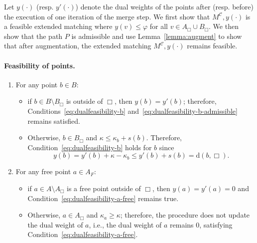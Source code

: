 \documentclass[11pt,onecolumn]{article}
\def\mcC{{\mathcal{C}}}
\newcommand{\cell}{\Box}
\newcommand{\distancetocell}[2]{\mathrm{d}(#1, #2)}
\newcommand{\ymax}{\varphi}
\newcommand\myparagraph[1]{\paragraph{#1}}
\begin{document}
Let $y(\cdot)$ (resp. $y'(\cdot)$) denote the dual weights of the points after (resp. before) the execution of one iteration of the merge step. We first show that $M^\mcC, y(\cdot)$ is a feasible extended matching where $y(v)\le \ymax$ for all $v\in A_\cell\cup B_\cell$. We then show that the path $P$ is admissible and use Lemma~\ref{lemma:augment} to show that after augmentation, the extended matching $M^\mcC, y(\cdot)$ remains feasible.

\myparagraph{Feasibility of points.}
    \begin{enumerate}
        \item For any point $b\in B$:
        \begin{itemize}
            \item if $b\in B\setminus B_\cell$ is outside of $\cell$, then $y(b)=y'(b)$; therefore, Conditions~\eqref{eq:dualfeasibility-b} and~\eqref{eq:dualfeasibility-b-admissible} remains satisfied.
            \item Otherwise, $b\in B_\cell$ and $\kappa\le \kappa_b+s(b)$. Therefore, Condition~\eqref{eq:dualfeasibility-b} holds for $b$ since 
            \begin{equation}\label{eq:local-hung-2}
                y(b) = y'(b) + \kappa - \kappa_b \le y'(b) + s(b) =\distancetocell{b}{\cell}. 
            \end{equation}
        \end{itemize}
        \item For any free point $a\in A_F$:
        \begin{itemize}
            \item if $a\in A\setminus A_\cell$ is a free point outside of $\cell$, then $y(a)=y'(a)=0$ and Condition~\eqref{eq:dualfeasibility-a-free} remains true. 
            \item Otherwise, $a\in A_\cell$ and $\kappa_a\ge \kappa$; therefore, the procedure does not update the dual weight of $a$, i.e., the dual weight of $a$ remains $0$, satisfying Condition~\eqref{eq:dualfeasibility-a-free}. 
        \end{itemize}
        
    \end{enumerate}
\end{document}
